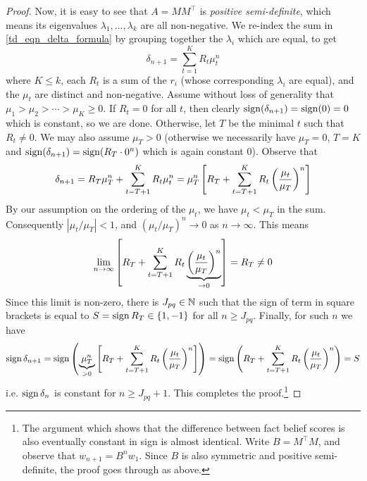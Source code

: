 \begin{proof}
    Now, it is easy to see that $A = MM^\top$ is \emph{positive semi-definite},
    which means its eigenvalues $\lambda_1,\ldots,\lambda_k$ are all
    non-negative. We re-index the sum in \cref{td_eqn_delta_formula} by grouping
    together the $\lambda_i$ which are equal, to get
    \[
        \delta_{n+1} = \sum_{t=1}^{K}{R_t \mu_t^n}
    \]
    where $K \le k$, each $R_t$ is a sum of the $r_i$ (whose corresponding
    $\lambda_i$ are equal), and the $\mu_t$ are distinct and non-negative.
    Assume without loss of generality that $\mu_1 > \mu_2 > \cdots > \mu_K \ge
    0$. If $R_t = 0$ for all $t$, then clearly $\operatorname{sign}(\delta_{n+1}) = \operatorname{sign}(0)
    = 0$ which is constant, so we are done. Otherwise, let $T$ be the minimal
    $t$ such that $R_t \ne 0$. We may also assume $\mu_T > 0$ (otherwise we
    necessarily have $\mu_T = 0$, $T=K$ and $\operatorname{sign}(\delta_{n+1}) = \operatorname{sign}(R_T
    \cdot 0^n)$ which is again constant 0). Observe that
    \[
        \delta_{n+1}
        = R_T \mu_T^n + \sum_{t=T + 1}^{K}{R_t \mu_t^n} \\
        = \mu_T^n \left[
            R_T + \sum_{t=T + 1}^{K}{
                R_t \left(\frac{\mu_t}{\mu_T}\right)^n
            }
        \right]
    \]
    By our assumption on the ordering of the $\mu_t$, we have $\mu_t < \mu_T$
    in the sum. Consequently $|\mu_t / \mu_T| < 1$, and $(\mu_t / \mu_T)^n \to
    0$ as $n \to \infty$. This means
    \[
        \lim_{n \to \infty}{\left[
            R_T + \sum_{t=T + 1}^{K}{
                R_t \underbrace{\left(\frac{\mu_t}{\mu_T}\right)^n}_{\to 0}
            }
        \right]}
        = R_T
        \ne 0
    \]
    Since this limit is non-zero, there is $J_{pq} \in \mathbb{N}$ such that the sign
    of term in square brackets is
    equal to $S = \operatorname{sign} R_T \in \{1, -1\}$ for all $n \ge J_{pq}$. Finally,
    for such $n$ we have
    \[
        \operatorname{sign} \delta_{n+1}
        = \operatorname{sign} \left(
            \underbrace{\mu_T^n}_{> 0}
            \left[
                R_T + \sum_{t=T + 1}^{K}{
                    R_t \left(\frac{\mu_t}{\mu_T}\right)^n
                }
            \right]
        \right)
        = \operatorname{sign} \left(
            R_T + \sum_{t=T + 1}^{K}{
                R_t \left(\frac{\mu_t}{\mu_T}\right)^n
            }
        \right)
        = S
    \]
    i.e. $\operatorname{sign} \delta_n$ is constant for $n \ge J_{pq} + 1$. This completes
    the proof.\footnote{
        The argument which shows that the difference between fact belief scores
        is also eventually constant in sign is almost identical. Write $B =
        M^{\top}M$, and observe that $w_{n+1} = B^nw_1$. Since $B$ is also
        symmetric and positive semi-definite, the proof goes through as above.
    }
\end{proof}

